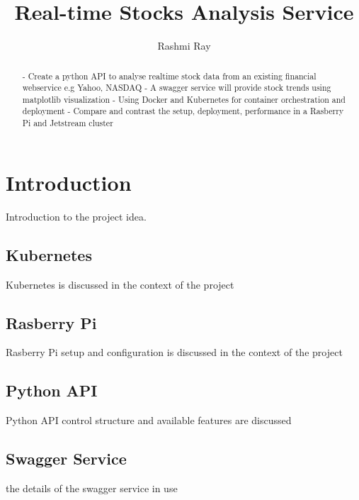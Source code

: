 
\title{Real-time Stocks Analysis Service}

\author{Rashmi Ray}

\renewcommand{\shortauthors}{Uma Kugan}
\begin{abstract}
 - Create a python API to analyse realtime stock data from an existing financial webservice e.g Yahoo, NASDAQ
 - A swagger service will provide stock trends using matplotlib visualization
 - Using Docker and Kubernetes for container orchestration and deployment
 - Compare and contrast the setup, deployment, performance  in a Rasberry Pi and Jetstream cluster

\end{abstract}



\maketitle

\section{Introduction}
Introduction to the project idea.

\subsection{Kubernetes}
Kubernetes is discussed in the context of the project

\subsection{Rasberry Pi}
Rasberry Pi setup and configuration is discussed in the context of the project

\subsection{Python API}
Python API control structure and available features are discussed

\subsection{Swagger Service}
the details of the swagger service in use


